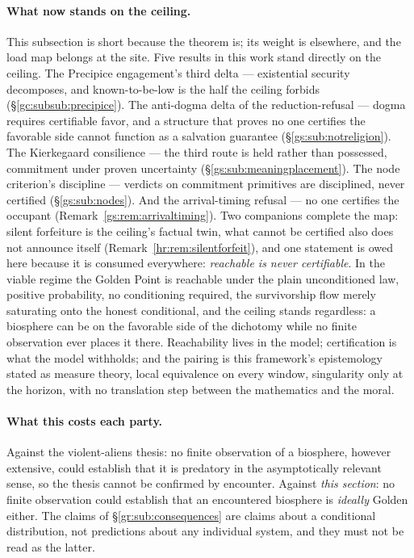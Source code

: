 \documentclass[11pt]{article}
\numberwithin{equation}{section}
\theoremstyle{plain}
\theoremstyle{definition}
\theoremstyle{remark}
\begin{document}
\paragraph{What now stands on the ceiling.}\label{gr:rem:ceilingconsumers}
This subsection is short because the theorem is; its weight is
elsewhere, and the load map belongs at the site. Five results in
this work stand directly on the ceiling. The Precipice engagement's
third delta --- existential security decomposes, and
known-to-be-low is the half the ceiling forbids
(\S\ref{gc:subsub:precipice}). The anti-dogma delta of the
reduction-refusal --- dogma requires certifiable favor, and a
structure that proves no one certifies the favorable side cannot
function as a salvation guarantee (\S\ref{gs:sub:notreligion}). The
Kierkegaard consilience --- the third route is held rather than
possessed, commitment under proven uncertainty
(\S\ref{gs:sub:meaningplacement}). The node criterion's discipline
--- verdicts on commitment primitives are disciplined, never
certified (\S\ref{gs:sub:nodes}). And the arrival-timing refusal ---
no one certifies the occupant (Remark~\ref{gs:rem:arrivaltiming}).
Two companions complete the map: silent forfeiture is the ceiling's
factual twin, what cannot be certified also does not announce
itself (Remark~\ref{hr:rem:silentforfeit}), and one statement is
owed here because it is consumed everywhere: \emph{reachable is
never certifiable}. In the viable regime the Golden Point is
reachable under the plain unconditioned law, positive probability,
no conditioning required, the survivorship flow merely saturating
onto the honest conditional, and the ceiling stands regardless: a
biosphere can be on the favorable side of the dichotomy while no
finite observation ever places it there. Reachability lives in the
model; certification is what the model withholds; and the pairing is
this framework's epistemology stated as measure theory, local
equivalence on every window, singularity only at the horizon, with
no translation step between the mathematics and the moral.

\paragraph{What this costs each party.}\label{gr:rem:evenhanded}
Against the violent-aliens thesis: no finite observation of a biosphere,
however extensive, could establish that it is predatory in the
asymptotically relevant sense, so the thesis cannot be confirmed by
encounter. Against \emph{this section}: no finite observation could establish that
an encountered biosphere is \emph{ideally} Golden either. The claims of
\S\ref{gr:sub:consequences} are claims about a conditional
distribution, not predictions about any individual system, and they must
not be read as the latter.
\end{document}
